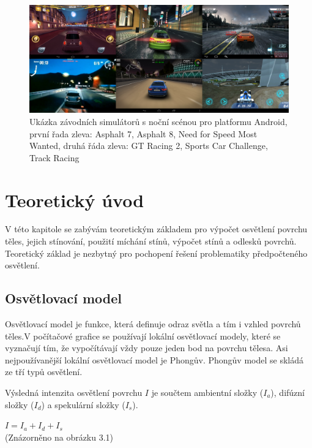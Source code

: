 \documentclass[11pt,twoside,a4paper]{book}
\begin{document}
\begin{center}
\begin{figure}[h!]
\includegraphics[width=150mm]{figures/games.png}
\caption{Ukázka závodních simulátorů s noční scénou pro platformu Android, první řada zleva: Asphalt 7, Asphalt 8, Need for Speed Most Wanted, druhá řáda zleva: GT Racing 2, Sports Car Challenge, Track Racing}
\end{figure}
\end{center}

\chapter{Teoretický úvod}
V této kapitole se zabývám teoretickým základem pro výpočet osvětlení povrchu těles, jejich stínování, použití míchání stínů, výpočet stínů a odlesků povrchů. Teoretický základ je nezbytný pro pochopení řešení problematiky předpočteného osvětlení.

\section{Osvětlovací model}
Osvětlovací model je funkce, která definuje odraz světla a tím i vzhled povrchů těles.\linebreak V počítačové grafice se používají lokální osvětlovací modely, které se vyznačují tím, že vypočítávají vždy pouze jeden bod na povrchu tělesa. Asi nejpoužívanější lokální osvětlovací model je Phongův. Phongův model se skládá ze tří typů osvětlení.

Výsledná intenzita osvětlení povrchu $I$ je součtem ambientní složky ($I_a$), difúzní složky ($I_d$) a spekulární složky ($I_s$).
\begin{center}
$I = I_a + I_d + I_s$\\
(Znázorněno na obrázku 3.1)
\end{center}
\end{document}
